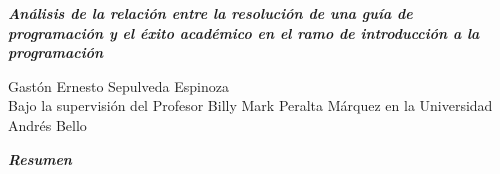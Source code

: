 \begin{center}
    \textbf{\LARGE \textit{Análisis de la relación entre la resolución de una guía de programación y el éxito académico en el ramo de introducción a la programación}}
    
    \vspace{1cm} %

    \fontsize{12}{14}\selectfont
    Gastón Ernesto Sepulveda Espinoza \\


    Bajo la supervisión del Profesor Billy Mark Peralta Márquez en la Universidad Andrés Bello

\end{center}

\vspace{1cm} %





\begin{center}
    \textbf{\LARGE \textit{Resumen}}
\end{center}

